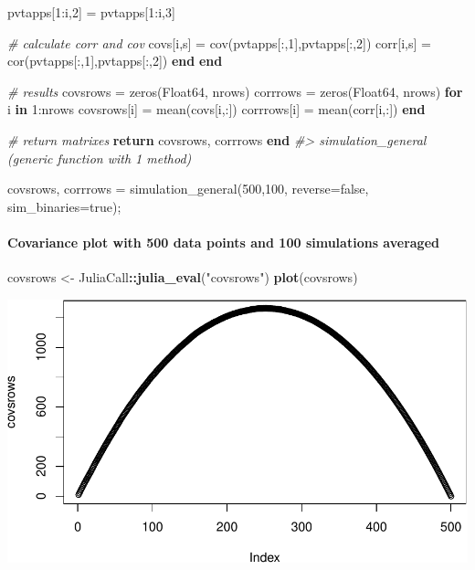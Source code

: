 \documentclass[]{article}
\newenvironment{Shaded}{\begin{snugshade}}{\end{snugshade}}
\newcommand{\CommentTok}[1]{\textcolor[rgb]{0.56,0.35,0.01}{\textit{#1}}}
\newcommand{\DataTypeTok}[1]{\textcolor[rgb]{0.13,0.29,0.53}{#1}}
\newcommand{\FloatTok}[1]{\textcolor[rgb]{0.00,0.00,0.81}{#1}}
\newcommand{\KeywordTok}[1]{\textcolor[rgb]{0.13,0.29,0.53}{\textbf{#1}}}
\newcommand{\NormalTok}[1]{#1}
\newcommand{\OperatorTok}[1]{\textcolor[rgb]{0.81,0.36,0.00}{\textbf{#1}}}
\newcommand{\StringTok}[1]{\textcolor[rgb]{0.31,0.60,0.02}{#1}}
\let\oldparagraph\paragraph
\renewcommand{\paragraph}[1]{\oldparagraph{#1}\mbox{}}
\begin{document}
\begin{Shaded}
\begin{Highlighting}[]
\NormalTok{            pvtapps[}\FloatTok{1}\NormalTok{:i,}\FloatTok{2}\NormalTok{] = pvtapps[}\FloatTok{1}\NormalTok{:i,}\FloatTok{3}\NormalTok{]}

            \CommentTok{# calculate corr and cov}
\NormalTok{            covs[i,s] = cov(pvtapps[:,}\FloatTok{1}\NormalTok{],pvtapps[:,}\FloatTok{2}\NormalTok{])}
\NormalTok{            corr[i,s] = cor(pvtapps[:,}\FloatTok{1}\NormalTok{],pvtapps[:,}\FloatTok{2}\NormalTok{])}
        \KeywordTok{end}
    \KeywordTok{end}

    \CommentTok{# results}
\NormalTok{    covsrows = zeros(}\DataTypeTok{Float64}\NormalTok{, nrows)}
\NormalTok{    corrrows = zeros(}\DataTypeTok{Float64}\NormalTok{, nrows)}
    \KeywordTok{for}\NormalTok{ i }\KeywordTok{in} \FloatTok{1}\NormalTok{:nrows}
\NormalTok{        covsrows[i] = mean(covs[i,:])}
\NormalTok{        corrrows[i] = mean(corr[i,:])}
    \KeywordTok{end}

    \CommentTok{# return matrixes}
    \KeywordTok{return}\NormalTok{ covsrows, corrrows}
\KeywordTok{end}
\CommentTok{#> simulation_general (generic function with 1 method)}

\NormalTok{covsrows, corrrows = simulation_general(}\FloatTok{500}\NormalTok{,}\FloatTok{100}\NormalTok{, reverse=false, sim_binaries=true);}
\end{Highlighting}
\end{Shaded}

\newpage

\hypertarget{covariance-plot-with-500-data-points-and-100-simulations-averaged}{%
\paragraph{Covariance plot with 500 data points and 100 simulations
averaged}\label{covariance-plot-with-500-data-points-and-100-simulations-averaged}}

\begin{Shaded}
\begin{Highlighting}[]
\NormalTok{covsrows <-}\StringTok{ }\NormalTok{JuliaCall}\OperatorTok{::}\KeywordTok{julia_eval}\NormalTok{(}\StringTok{"covsrows"}\NormalTok{)}
\KeywordTok{plot}\NormalTok{(covsrows)}
\end{Highlighting}
\end{Shaded}

\includegraphics{./figures/unnamed-chunk-10-1.pdf}
\end{document}
